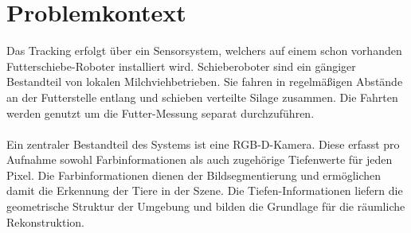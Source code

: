 \documentclass[12pt,DIV=15,BCOR=15mm,twoside,headsepline,abstract=true,listof=totoc,bibliography=totoc]{scrreprt}
\theoremstyle{remark}    %
\begin{document}
    \section{Problemkontext} \label{sec:problem}
    Das Tracking erfolgt über ein Sensorsystem, welchers auf einem schon vorhanden Futterschiebe-Roboter installiert wird. Schieberoboter sind ein 
    gängiger Bestandteil von lokalen Milchviehbetrieben. Sie fahren in regelmäßigen Abstände an der Futterstelle entlang und schieben verteilte Silage 
    zusammen. Die Fahrten werden genutzt um die Futter-Messung separat durchzuführen.\\\\
    Ein zentraler Bestandteil des Systems ist eine \ac{RGB-D}-Kamera.
    Diese erfasst pro Aufnahme sowohl Farbinformationen als auch zugehörige Tiefenwerte für jeden Pixel.
    Die Farbinformationen dienen der Bildsegmentierung und ermöglichen damit die Erkennung der Tiere in der Szene.
    Die Tiefen-Informationen liefern die geometrische Struktur der Umgebung und bilden die Grundlage für die räumliche Rekonstruktion.
\end{document}
